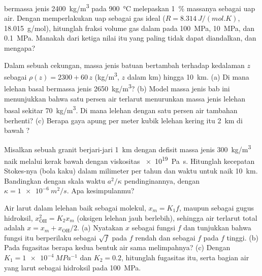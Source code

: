 \begin{exercise}[$\star\star$]\label{exo:b2:magma-emplacement:7}
 bermassa jenis \qty{2400}{kg/m^3} pada \qty{900}{\celsius} melepaskan
\qty{1}{\percent} massanya sebagai uap air. Dengan memperlakukan uap sebagai gas ideal
($R = \qty{8.314}{J/(mol.K)}$, \qty{18.015}{g/mol}), hitunglah fraksi volume
gas dalam  pada \qty{100}{MPa}, \qty{10}{MPa}, dan \qty{0.1}{MPa}. Manakah dari ketiga
nilai itu yang paling tidak dapat diandalkan, dan mengapa?
\end{exercise}

\begin{exercise}[$\star\star$]\label{exo:b2:magma-emplacement:8}
Dalam sebuah cekungan, massa jenis batuan bertambah terhadap kedalaman $z$ sebagai $\rho(z) =
2300 + 60\,z$ (\unit{kg/m^3}, $z$ dalam \unit{km}) hingga \qty{10}{km}. (a) Di mana
 lelehan basal bermassa jenis \qty{2650}{kg/m^3}? (b) Model
massa jenis bab ini menunjukkan bahwa satu persen air terlarut menurunkan
massa jenis lelehan basal sekitar \qty{70}{kg/m^3}. Di mana lelehan dengan
satu persen air tambahan berhenti? (c) Berapa gaya apung per meter kubik
lelehan kering itu \qty{2}{km} di bawah ?
\end{exercise}

\begin{exercise}[$\star\star$]\label{exo:b2:magma-emplacement:9}
Misalkan sebuah  granit berjari-jari \qty{1}{km} dengan defisit massa jenis
\qty{300}{kg/m^3} naik melalui kerak bawah dengan viskositas \qty{e19}{Pa.s}. Hitunglah
kecepatan Stokes-nya (bola kaku) dalam milimeter per tahun dan waktu untuk naik
\qty{10}{km}. Bandingkan dengan skala waktu $a^2/\kappa$ pendinginannya, dengan $\kappa
= \qty{1e-6}{m^2/s}$. Apa kesimpulanmu?
\end{exercise}

\begin{exercise}[$\star\star\star$]\label{exo:b2:magma-emplacement:10}
Air larut dalam lelehan baik sebagai molekul, $x_m = K_1 f$, maupun sebagai gugus
hidroksil, $x_{\mathrm{OH}}^2 = K_2 x_m$ (oksigen lelehan jauh berlebih), sehingga
air terlarut total adalah $x = x_m + x_{\mathrm{OH}}/2$. (a) Nyatakan $x$ sebagai
fungsi $f$ dan tunjukkan bahwa fungsi itu berperilaku sebagai $\sqrt f$ pada $f$ rendah dan sebagai $f$ pada
$f$ tinggi. (b) Pada fugasitas berapa kedua bentuk air sama melimpahnya? (c)
Dengan $K_1 = \qty{1e-4}{MPa^{-1}}$ dan $K_2 = 0.2$, hitunglah fugasitas itu, serta
bagian air yang larut sebagai hidroksil pada \qty{100}{MPa}.
\end{exercise}

